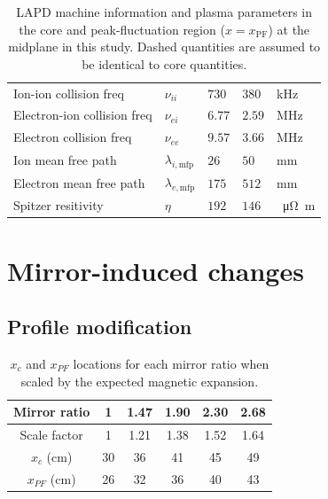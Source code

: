 \begin{table}
\begin{tabular}{l l l l l}
        Ion-ion collision freq & $\nu_{ii}$ & $730$ & $380$ & kHz \\
        Electron-ion collision freq & $\nu_{ei}$ & $6.77$ & $2.59$ & MHz \\
        Electron collision freq & $\nu_{ee}$ & $9.57$ & $3.66$ & MHz \\
        Ion mean free path & $\lambda_{i,\text{mfp}}$ & $26$ & $50$ & mm \\
        Electron mean free path & $\lambda_{e, \text{mfp}}$ & $175$ & $512$ & mm \\
        Spitzer resitivity &  $\eta$ & $192$ & $146$ & \SI{}{\micro \ohm \meter} \\
        
    \end{tabular}
    \caption[LAPD plasma parameters]{LAPD machine information and plasma parameters in the core and peak-fluctuation region ($x=x_\text{PF}$) at the midplane in this study. Dashed quantities are assumed to be identical to core quantities.}
    \label{tab:plasma-parameters}
\end{table}

\section{\label{sec:changes}Mirror-induced changes}

\subsection{Profile modification}

\begin{table}
    \centering
    \begin{tabular}{c c c c c c}
         Mirror ratio & 1 & 1.47 & 1.90 & 2.30 & 2.68 \\
         \hline
         Scale factor & 1 & 1.21 & 1.38 & 1.52 & 1.64\\
         $x_{c}$ (cm) & 30 & 36 & 41 & 45 & 49 \\
         $x_{PF}$ (cm) & 26 & 32 & 36 & 40 & 43 \\
    \end{tabular}
    \caption[$x_c$ and $x_{PF}$ locations for each mirror ratio]{$x_c$ and $x_{PF}$ locations for each mirror ratio when scaled by the expected magnetic expansion.}
    \label{tab:x_PF}
\end{table}


